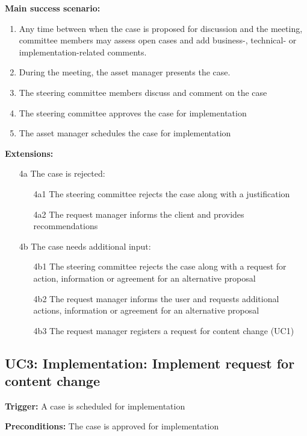 	\textbf{Main success scenario:}
	
	\begin{enumerate}
		\item Any time between when the case is proposed for discussion and the meeting, committee members may assess open cases and add business-, technical- or implementation-related comments. 
		\item During the meeting, the asset manager presents the case.
		\item The steering committee members discuss and comment on the case
		\item The steering committee approves the case for implementation
		\item The asset manager schedules the case for implementation		
	\end{enumerate}
	\textbf{Extensions:}
	\begin{enumerate}
		\item [4a] The case is rejected:
		\begin{enumerate}
			\item [4a1] The steering committee rejects the case along with a justification
			\item [4a2] The request manager informs the client and provides recommendations			
		\end{enumerate}
		\item [4b] The case needs additional input:
		\begin{enumerate}
			\item [4b1]  The steering committee rejects the case along with a request for action, information or agreement for an alternative proposal
			\item [4b2] The request manager informs the user and requests additional actions, information or agreement for an alternative proposal
			\item [4b3] The request manager registers a request for content change (UC1)
		\end{enumerate}
	\end{enumerate}

	\subsection{UC3: Implementation: Implement request for content change}
	\label{sec:uc3}
	
	\textbf{Trigger:} A case is scheduled for implementation
	
	\textbf{Preconditions:} The case is approved for implementation
	

